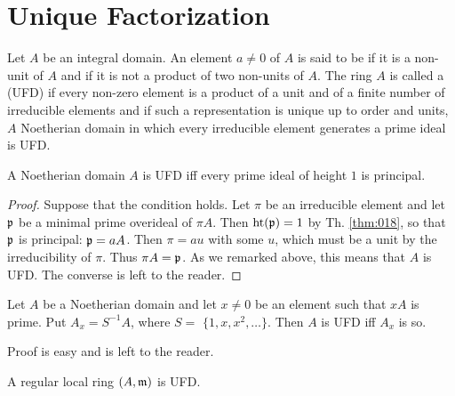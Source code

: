 \documentclass[../main]{subfiles}
\begin{document}
\section{Unique Factorization}\label{sec:19}

\newparagraph Let $A$ be an integral domain. An element $a \neq 0$ of $A$ is said to be  if it is a non-unit of $A$ and if it
is not a product of two non-units of $A$. The ring $A$ is called a  (UFD) if every non-zero element is a product of a unit and of a finite number of irreducible elements and if such a representation is unique up to order and units, $A$ Noetherian domain in which every irreducible element generates a prime ideal is UFD.
\begin{theorem}\label{thm:047}
 A Noetherian domain $A$ is UFD iff every prime ideal of height $1$ is principal.
\end{theorem}
\begin{proof}
 Suppose that the condition holds. Let $\pi$ be an irreducible element and let $\mathfrak{p}$ be a minimal prime overideal of $\pi A$. Then $\operatorname{ht}(\mathfrak{p})=1$ by Th. \ref{thm:018}, so that $\mathfrak{p}$ is principal: $\mathfrak{p}=a A$. Then $\pi= au$ with some $u$, which must be a unit by the irreducibility of $\pi$. Thus $\pi A= \mathfrak{p}$. As we remarked above, this means that $A$ is UFD. The converse is left to the reader.
\end{proof}

\begin{parlemma}
Let $A$ be a Noetherian domain and let $x \neq 0$ be an element such that $x A$ is prime. Put $A_x=S^{-1} A$, where $S=$ $\{1, x, x^2, \ldots\}$. Then $A$ is UFD iff $A_x$ is so.
\end{parlemma} 

Proof is easy and is left to the reader.

\begin{theorem}\label{thm:048}
 A regular local ring $(A, \mathfrak{m})$ is UFD.
\end{theorem}
\end{document}
